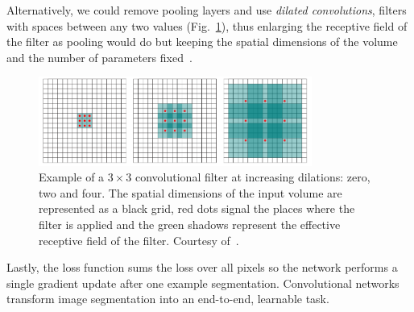 Alternatively, we could remove pooling layers and use \emph{dilated convolutions}, filters with spaces between any two values (Fig.~\ref{fig:DilatedConvolutions}), thus enlarging the receptive field of the filter as pooling would do but keeping the spatial dimensions of the volume and the number of parameters fixed~\cite{Yu2016}.
\begin{figure}[h]
	\centering
	\includegraphics[width=0.8\textwidth]{plots/dilatedConv.png}
	\caption[Example of dilated convolutions]{Example of a $3\times3$ convolutional filter at increasing dilations: zero, two and four. The spatial dimensions of the input volume are represented as a black grid, red dots signal the places where the filter is applied and the green shadows represent the effective receptive field of the filter. Courtesy of~\cite{Yu2016}.}
	\label{fig:DilatedConvolutions}
\end{figure}

Lastly, the loss function sums the loss over all pixels so the network performs a single gradient update after one example segmentation. Convolutional networks transform image segmentation into an end-to-end, learnable task.

